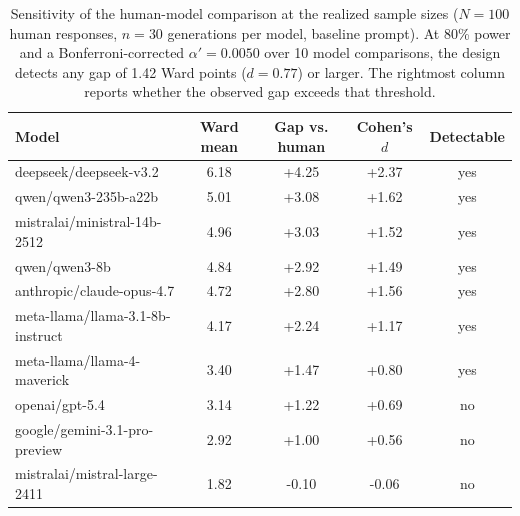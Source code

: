 \begin{table}[htb]
  \centering
  \caption{Sensitivity of the human-model comparison at the realized sample sizes ($N=100$ human responses, $n=30$ generations per model, baseline prompt). At 80\% power and a Bonferroni-corrected $\alpha' = 0.0050$ over 10 model comparisons, the design detects any gap of 1.42 Ward points ($d = 0.77$) or larger. The rightmost column reports whether the observed gap exceeds that threshold.}
  \small
  \label{tab:sensitivity_human}
  \begin{tabular}{lcccc}
    \toprule
    Model & Ward mean & Gap vs. human & Cohen's $d$ & Detectable \\
    \midrule
    deepseek/deepseek-v3.2 & 6.18 & +4.25 & +2.37 & yes \\
    qwen/qwen3-235b-a22b & 5.01 & +3.08 & +1.62 & yes \\
    mistralai/ministral-14b-2512 & 4.96 & +3.03 & +1.52 & yes \\
    qwen/qwen3-8b & 4.84 & +2.92 & +1.49 & yes \\
    anthropic/claude-opus-4.7 & 4.72 & +2.80 & +1.56 & yes \\
    meta-llama/llama-3.1-8b-instruct & 4.17 & +2.24 & +1.17 & yes \\
    meta-llama/llama-4-maverick & 3.40 & +1.47 & +0.80 & yes \\
    openai/gpt-5.4 & 3.14 & +1.22 & +0.69 & no \\
    google/gemini-3.1-pro-preview & 2.92 & +1.00 & +0.56 & no \\
    mistralai/mistral-large-2411 & 1.82 & -0.10 & -0.06 & no \\
    \bottomrule
  \end{tabular}
\end{table}

